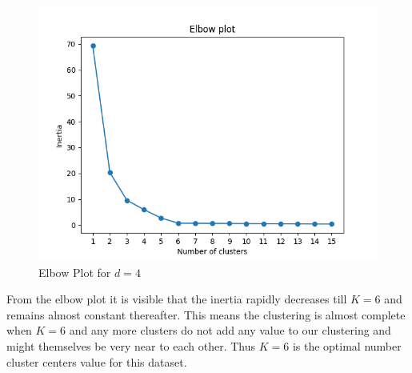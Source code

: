 \documentclass[hidelinks,12pt]{article}
\begin{document}
\begin{figure}[H]
  \centering
  \includegraphics[width=\textwidth]{elbow_4.png}
  \caption{Elbow Plot for \(d = 4\)}
\end{figure}

From the elbow plot it is visible that the inertia rapidly decreases till \(K=6\)
and remains almost constant thereafter. This means the clustering is almost complete when \(K=6\) and any more clusters do not add any value to our clustering and might themselves be very near to each other. Thus \(K=6\) is the optimal number cluster centers value for this dataset.
\end{document}
